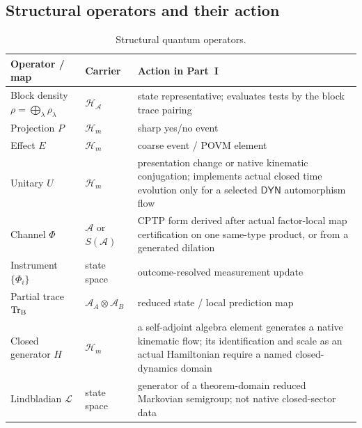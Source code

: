 \documentclass[12pt,a4paper]{article}
\begin{document}
\subsection{Structural operators and their action}
\label{p4:sec:part1-operators}

\begin{table}[!htbp]
\centering
\caption[Structural quantum operators]{Structural quantum operators.}
\label{p4:tab:structural-operators}
\renewcommand{\arraystretch}{1.2}
\begin{tabularx}{\textwidth}{>{\raggedright\arraybackslash}p{}
                                >{\raggedright\arraybackslash}p{}
                                >{\raggedright\arraybackslash}X}
\toprule
\textbf{Operator / map} & \textbf{Carrier} & \textbf{Action in Part~I} \\
\midrule
Block density \(\rho=\bigoplus_\lambda\rho_\lambda\) & \(\mathcal H_{\mathcal A}\) & state representative; evaluates tests by the block trace pairing \\

Projection $P$ & $\mathcal H_m$ & sharp yes/no event \\

Effect $E$ & $\mathcal H_m$ & coarse event / POVM element \\

Unitary $U$ & $\mathcal H_m$ & presentation change or native kinematic
conjugation; implements actual closed time evolution only for a selected
\(\mathsf{DYN}\) automorphism flow \\

Channel \(\Phi\) & \(\mathcal A\) or \(S(\mathcal A)\) & CPTP form derived after actual factor-local map certification on one same-type product, or from a generated dilation \\

Instrument $\{\Phi_i\}$ & state space & outcome-resolved measurement update \\

Partial trace $\operatorname{Tr_{B}}$ & $\mathcal A_A\otimes\mathcal A_B$ & reduced state / local prediction map \\

Closed generator $H$ & $\mathcal H_m$ & a self-adjoint algebra element
generates a native kinematic flow; its identification and scale as an actual
Hamiltonian require a named closed-dynamics domain \\

Lindbladian $\mathcal L$ & state space & generator of a theorem-domain reduced Markovian semigroup; not native closed-sector data \\
\bottomrule
\end{tabularx}
\end{table}
\end{document}
